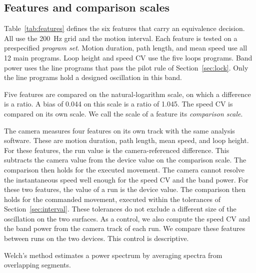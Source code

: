 \subsection{Features and comparison scales}
\label{sec:features}
Table~\ref{tab:features} defines the six features that carry an equivalence decision.
All use the 200~Hz grid and the motion interval.
Each feature is tested on a prespecified \emph{program set}.
Motion duration, path length, and mean speed use all 12 main programs.
Loop height and speed CV use the five loops programs.
Band power uses the line programs that pass the pilot rule of Section~\ref{sec:lock}.
Only the line programs hold a designed oscillation in this band.

Five features are compared on the natural-logarithm scale, on which a difference is a ratio.
A bias of 0.044 on this scale is a ratio of 1.045.
The speed CV is compared on its own scale.
We call the scale of a feature its \emph{comparison scale}.

The camera measures four features on its own track with the same analysis software.
These are motion duration, path length, mean speed, and loop height.
For these features, the run value is the camera-referenced difference.
This subtracts the camera value from the device value on the comparison scale.
The comparison then holds for the executed movement.
The camera cannot resolve the instantaneous speed well enough for the speed CV and the band power.
For these two features, the value of a run is the device value.
The comparison then holds for the commanded movement, executed within the tolerances of Section~\ref{sec:interval}.
These tolerances do not exclude a different size of the oscillation on the two surfaces.
As a control, we also compute the speed CV and the band power from the camera track of each run.
We compare these features between runs on the two devices.
This control is descriptive.

Welch's method estimates a power spectrum by averaging spectra from overlapping segments.

